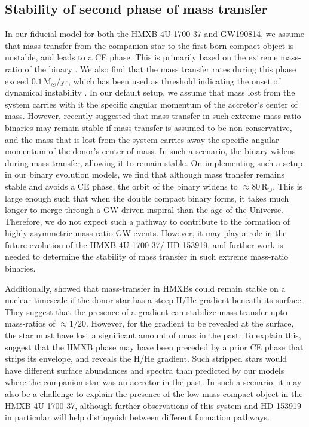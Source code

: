 \documentclass[linenumbers,trackchanges,twocolumn]{aastex701}
\newcommand{\Mdot}{\mathrm{M}_{\odot}}
\newcommand{\Rdot}{\mathrm{R}_{\odot}}
\begin{document}
\subsection{Stability of second phase of mass transfer} \label{stable}

In our fiducial model for both the HMXB 4U 1700-37 and GW190814,
we assume that mass transfer from the companion star to the first-born
compact object is unstable, and leads to a CE phase.
This is primarily based on the extreme mass-ratio of the binary
\citep[e.g.,][]{2014A&A...563A..83C,2017MNRAS.465.2092P}.
We also find that the mass transfer rates during this phase exceed
$0.1\,\Mdot/\mathrm{yr}$, which has been used as threshold
indicating the onset of dynamical instability \citep[e.g.,][]{2023ApJS..264...45F}. In our default setup, we assume that mass lost from the system carries with it the specific angular momentum of the accretor's center of mass. However, recently \cite{2025arXiv251110728O} suggested that mass transfer in such extreme mass-ratio binaries may remain stable if mass transfer is assumed to be non conservative, and the mass that is lost from the system carries away the specific angular momentum of the donor's center of mass. In such a scenario, the binary widens during mass transfer, allowing it to remain stable. On implementing such a setup in our binary evolution models, we find that although mass transfer remains stable and avoids a CE phase, the orbit of the binary widens to $\approx 80\,\Rdot$. This is large enough such that when the double compact binary forms, it takes much longer to merge through a GW driven inspiral than the age of the Universe. Therefore, we do not expect such a pathway to contribute to the formation of highly asymmetric mass-ratio GW events. However, it may play a role in the future evolution of the HMXB 4U 1700-37/ HD 153919, and further work is needed to determine the stability of mass transfer in such extreme mass-ratio binaries.

Additionally, \cite{2019A&A...628A..19Q} showed that mass-transfer in HMXBs could remain stable on a nuclear timescale if the donor star has a steep H/He gradient beneath its surface. They suggest that the presence of a gradient can stabilize mass transfer upto mass-ratios of $\approx 1/20$. However, for the gradient to be revealed at the surface, the star must have lost a significant amount of mass in the past. To explain this, \cite{2019A&A...628A..19Q} suggest that the HMXB phase may have been preceded by a prior CE phase that strips its envelope, and reveals the H/He gradient. Such stripped stars would have different surface abundances and spectra than predicted by our models where the companion star was an accretor in the past. In such a scenario, it may also be a challenge to explain the presence of the low mass compact object in the HMXB 4U 1700-37, although further observations of this system and HD 153919 in particular will help distinguish between different formation pathways.
\end{document}

